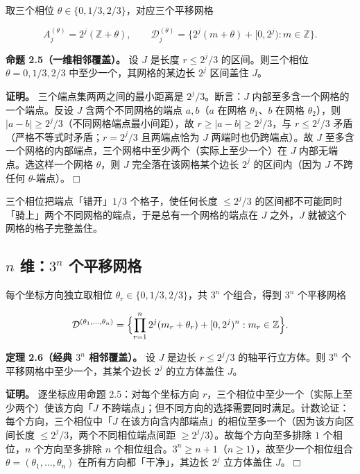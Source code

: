 \documentclass[a4paper,11pt,openany]{ctexbook}
\numberwithin{equation}{chapter}
\numberwithin{figure}{chapter}
\numberwithin{table}{chapter}
\begin{document}
取三个相位 $\theta\in\{0,1/3,2/3\}$，对应三个平移网格

$$A_j^{(\theta)}=2^j(\mathbb Z+\theta),\qquad \mathcal D_j^{(\theta)}=\{2^j(m+\theta)+[0,2^j):m\in\mathbb Z\}.$$

\textbf{命题 2.5（一维相邻覆盖）。} 设 $J$ 是长度 $r\le 2^j/3$ 的区间。则三个相位 $\theta=0,1/3,2/3$ 中至少一个，其网格的某边长 $2^j$ 区间盖住 $J$。

\textbf{证明。} 三个端点集两两之间的最小距离是 $2^j/3$。断言：$J$ 内部至多含一个网格的一个端点。反设 $J$ 含两个不同网格的端点 $a,b$（$a$ 在网格 $\theta_1$、$b$ 在网格 $\theta_2$），则 $|a-b|\ge 2^j/3$（不同网格端点最小间距），故 $r\ge|a-b|\ge 2^j/3$，与 $r\le 2^j/3$ 矛盾（严格不等式时矛盾；$r=2^j/3$ 且两端点恰为 $J$ 两端时也仍跨端点）。故 $J$ 至多含一个网格的内部端点，三个网格中至少两个（实际上至少一个）在 $J$ 内部无端点。选这样一个网格 $\theta$，则 $J$ 完全落在该网格某个边长 $2^j$ 的区间内（因为 $J$ 不跨任何 $\theta$-端点）。$\Box$

\begin{intuitionbox}
三个相位把端点「错开」$1/3$ 个格子，使任何长度 $\le 2^j/3$ 的区间都不可能同时「骑上」两个不同网格的端点，于是总有一个网格的端点在 $J$ 之外，$J$ 就被这个网格的格子完整盖住。
\end{intuitionbox}

\subsection{$n$ 维：$3^n$ 个平移网格}

每个坐标方向独立取相位 $\theta_r\in\{0,1/3,2/3\}$，共 $3^n$ 个组合，得到 $3^n$ 个平移网格

$$\mathcal D^{(\theta_1,\dots,\theta_n)} = \Bigl\{\prod_{r=1}^n 2^j(m_r+\theta_r)+[0,2^j)^n : m_r\in\mathbb Z\Bigr\}.$$

\textbf{定理 2.6（经典 $3^n$ 相邻覆盖）。} 设 $J$ 是边长 $r\le 2^j/3$ 的轴平行立方体。则 $3^n$ 个平移网格中至少一个，其某个边长 $2^j$ 的立方体盖住 $J$。

\textbf{证明。} 逐坐标应用命题 2.5：对每个坐标方向 $r$，三个相位中至少一个（实际上至少两个）使该方向「$J$ 不跨端点」；但不同方向的选择需要同时满足。计数论证：每个方向，三个相位中「$J$ 在该方向含内部端点」的相位至多一个（因为该方向区间长度 $\le 2^j/3$，两个不同相位端点间距 $\ge 2^j/3$）。故每个方向至多排除 $1$ 个相位，$n$ 个方向至多排除 $n$ 个相位组合。$3^n\ge n+1$（$n\ge1$），故至少一个相位组合 $\theta=(\theta_1,\dots,\theta_n)$ 在所有方向都「干净」，其边长 $2^j$ 立方体盖住 $J$。$\Box$
\end{document}
